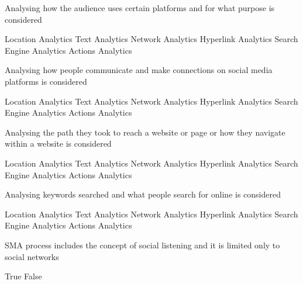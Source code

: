 \documentclass[theme=sleek, randomorder, hidesidemenu]{webquiz}
\begin{document}
\begin{question}
  Analysing how the audience uses certain platforms and for what purpose is considered
  \begin{choice}[columns=2]
    \incorrect Location Analytics
    \incorrect Text Analytics
    \incorrect Network Analytics
    \incorrect Hyperlink Analytics
    \incorrect Search Engine Analytics
    \correct Actions Analytics
  \end{choice}
\end{question}

\begin{question}
  Analysing how people communicate and make connections on social media platforms is considered
  \begin{choice}[columns=2]
    \incorrect Location Analytics
    \incorrect Text Analytics
    \correct Network Analytics
    \incorrect Hyperlink Analytics
    \incorrect Search Engine Analytics
    \incorrect Actions Analytics
  \end{choice}
\end{question}

\begin{question}
  Analysing the path they took to reach a website or page or how they navigate within a website is considered
  \begin{choice}[columns=2]
    \incorrect Location Analytics
    \incorrect Text Analytics
    \incorrect Network Analytics
    \correct Hyperlink Analytics
    \incorrect Search Engine Analytics
    \incorrect Actions Analytics
  \end{choice}
\end{question}

\begin{question}
  Analysing keywords searched and what people search  for online is considered
  \begin{choice}[columns=2]
    \incorrect Location Analytics
    \incorrect Text Analytics
    \incorrect Network Analytics
    \incorrect Hyperlink Analytics
    \correct Search Engine Analytics
    \incorrect Actions Analytics
  \end{choice}
\end{question}

\begin{question}
  SMA process includes the concept of social listening and it is limited only to social networks
  \begin{choice}[columns=2]
    \incorrect True
    \correct False
  \end{choice}
\end{question}
\end{document}
